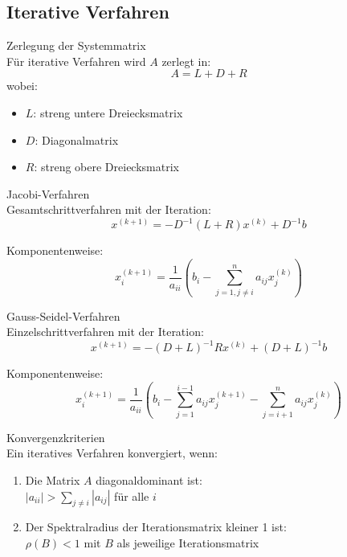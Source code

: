 \subsection{Iterative Verfahren}

\begin{definition}{Zerlegung der Systemmatrix}\\
Für iterative Verfahren wird $A$ zerlegt in:
$$A = L + D + R$$
wobei:
\begin{itemize}
    \item $L$: streng untere Dreiecksmatrix
    \item $D$: Diagonalmatrix
    \item $R$: streng obere Dreiecksmatrix
\end{itemize}
\end{definition}

\begin{concept}{Jacobi-Verfahren}\\
Gesamtschrittverfahren mit der Iteration:
$$x^{(k+1)} = -D^{-1}(L + R)x^{(k)} + D^{-1}b$$

Komponentenweise:
$$x_i^{(k+1)} = \frac{1}{a_{ii}}\left(b_i - \sum_{j=1,j\neq i}^n a_{ij}x_j^{(k)}\right)$$
\end{concept}

\begin{concept}{Gauss-Seidel-Verfahren}\\
Einzelschrittverfahren mit der Iteration:
$$x^{(k+1)} = -(D+L)^{-1}Rx^{(k)} + (D+L)^{-1}b$$

Komponentenweise:
$$x_i^{(k+1)} = \frac{1}{a_{ii}}\left(b_i - \sum_{j=1}^{i-1} a_{ij}x_j^{(k+1)} - \sum_{j=i+1}^n a_{ij}x_j^{(k)}\right)$$
\end{concept}

\begin{theorem}{Konvergenzkriterien}\\
Ein iteratives Verfahren konvergiert, wenn:
\begin{enumerate}
    \item Die Matrix $A$ diagonaldominant ist:\\
    $|a_{ii}| > \sum_{j\neq i} |a_{ij}|$ für alle $i$
    \item Der Spektralradius der Iterationsmatrix kleiner 1 ist:\\
    $\rho(B) < 1$ mit $B$ als jeweilige Iterationsmatrix
\end{enumerate}
\end{theorem}

